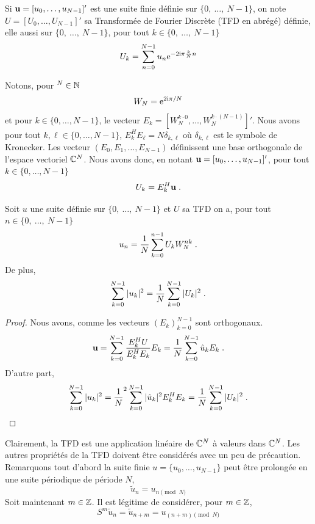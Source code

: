 \begin{definition}
Si $\mathbf{u}= [u_0,\dots,u_{N-1}]'$ est une suite finie d\'{e}finie sur $\{0,\ \ldots,\ N-1\}$, on note $U= [U_0,\dots,U_{N-1}]'$  sa Transform\'{e}e de Fourier Discr\`{e}te (TFD en abr\'{e}g\'{e}) d\'{e}finie, elle aussi sur $\{0,\ \ldots,\ N-1\}$, pour tout $k\in\{0,\ \ldots,\ N-1\}$
$$
U_k=\sum_{n=0}^{N-1} u_{n}\mathrm{e}^{-2\mathrm{i}\pi \frac{k}{N}n}
$$
\end{definition}
Notons, pour $^N \in \mathbb{N}$ 
\begin{equation}
\label{eq:definition-W_N}
W_N= \mathrm{e}^{2 \mathrm{i} \pi /N}
\end{equation}
et pour $k \in \{0,\dots,N-1\}$, le vecteur $E_k= [W_N^{k \cdot 0}, \dots, W_N^{k \cdot (N-1)}]'$.
Nous avons pour tout $k, \ell \in \{0, \dots, N-1\}$, $E_k^H E_\ell= N \delta_{k,\ell}$ où $\delta_{k,\ell}$ est le symbole de Kronecker.
Les vecteur $(E_0,E_1,\dots,E_{N-1})$ définissent une base orthogonale de l'espace vectoriel $\mathbb{C}^N$. 
Nous avons donc, en notant $\mathbf{u}= [u_0, \dots, u_{N-1}]'$, pour tout $k \in \{0,\dots,N-1\}$
\[
U_k = E_k^H \mathbf{u} \;.
\]
\begin{theorem}
Soit $u$ une suite d\'{e}finie sur $\{0,\ \ldots,\ N-1\}$ et $U$ sa TFD on a, pour tout $n\in\{0,\ \ldots,\ N-1\}$
$$
u_{n}=\frac{1}{N}\sum_{k=0}^{n-1} U_{k} W_N^{nk}  \;.
$$
De plus,
\[
\sum_{k=0}^{N-1} |u_k|^2 = \frac{1}{N} \sum_{k=0}^{N-1} |U_k|^2 \;.
\]
\end{theorem}
\begin{proof}
Nous avons, comme les vecteurs $(E_k)_{k=0}^{N-1}$ sont orthogonaux.
\[
\mathbf{u} = \sum_{k=0}^{N-1} \frac{E_k^H U}{E_k^H E_k} E_k = \frac{1}{N} \sum_{k=0}^{N-1} \hat{u}_k E_k \;.
\]
D'autre part,
\[
\sum_{k=0}^{N-1} |u_k|^2= \frac{1}{N}^2 \sum_{k=0}^{N-1} |\hat{u}_k|^2 E_k^H E_k= \frac{1}{N} \sum_{k=0}^{N-1} |U_k|^2 \;.
\]
\end{proof}
Clairement, la TFD est une application lin\'eaire de $\mathbb{C}^N$ \`a valeurs dans $\mathbb{C}^N$.
Les autres propri\'et\'es de la TFD doivent être consid\'er\'es avec un peu de pr\'ecaution.
Remarquons tout d'abord la suite finie $u= \{u_0, \dots, u_{N-1}\}$ peut être prolong\'ee en une suite p\'eriodique de
p\'eriode $N$,
\begin{equation}\label{eq:periodisee}
\tilde{u}_n= u_{ n \pmod{N}}
\end{equation}
Soit maintenant $m \in \mathbb{Z}$. Il est l\'egitime de consid\'erer, pour $m \in \mathbb{Z}$,
$$
S^m \tilde{u}_n = \tilde{u}_{n+m} = u_{ (n+m) \pmod{N} }
$$
